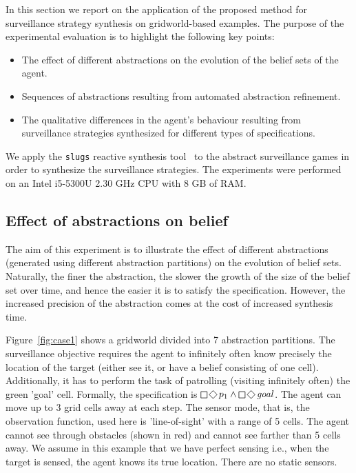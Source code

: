 In this section we report on the application of the proposed method for surveillance strategy synthesis on gridworld-based examples. The purpose of the experimental evaluation is to highlight the following key points:
\begin{itemize}
    \item The effect of different abstractions on the evolution of the belief sets of the agent.
    \item Sequences of abstractions resulting from automated abstraction refinement.
    \item The qualitative differences in the agent's behaviour resulting from surveillance strategies synthesized for different types of specifications.
\end{itemize}


We apply the \texttt{slugs} reactive synthesis tool~\cite{EhlersR16} to the abstract surveillance games in order to synthesize the surveillance strategies. The experiments were performed on an Intel i5-5300U 2.30 GHz CPU with 8 GB of RAM. 

\subsection{Effect of abstractions on belief}
The aim of this experiment is to illustrate the effect of different abstractions (generated using different abstraction partitions) on the evolution of belief sets. Naturally, the finer the abstraction, the slower the growth of the size of the belief set over time, and hence the easier it is to satisfy the specification. However, the increased precision of the abstraction comes at the cost of increased synthesis time. 

Figure~\ref{fig:case1} shows a gridworld divided into 7 abstraction partitions. The surveillance objective requires the agent to infinitely often know precisely the location of the target (either see it, or have a belief consisting of one cell). Additionally, it has to perform the task of patrolling (visiting infinitely often) the green 'goal' cell. Formally, the specification is $\LTLglobally\LTLfinally p_1 \wedge \LTLglobally\LTLfinally \mathit{goal}$. The agent can move up to 3 grid cells away at each step. The sensor mode, that is, the observation function, used here is 'line-of-sight' with a range of 5 cells. The agent cannot see through obstacles (shown in red) and cannot see farther than 5 cells away.  We assume in this example that we have perfect sensing i.e., when the target is sensed, the agent knows its true location. There are no static sensors. 


